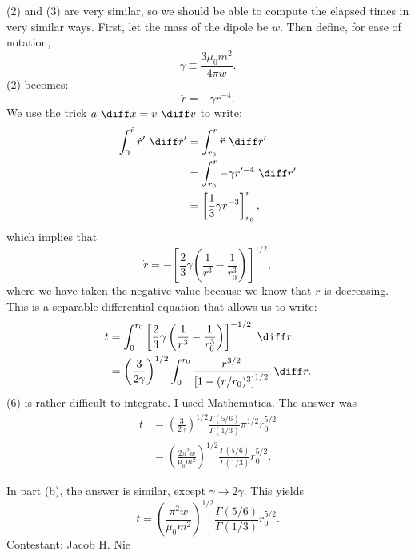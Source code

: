 \documentclass[12pt]{article}
\begin{document}
(2) and (3) are very similar, so we should be able to compute the elapsed times in very similar ways.  First, let the mass of the dipole be $w.$  Then define, for ease of notation,
\[
	\gamma \equiv \frac{3 \mu_0 m^2}{4 \pi w}.
\]
(2) becomes:
\begin{equation}
	\ddot{r} = -\gamma r^{-4}.
\end{equation}
We use the trick $a\ \diff x = v \ \diff v$ to write:
\begin{align*}
	\int_{0}^{\dot{r}} \dot{r}' \ \diff \dot{r} ' &= \int _{r_0}^{r} \ddot{r} \ \diff r' \\
						      &= \int_{r_0} ^{r} - \gamma r'^{-4} \ \diff r' \\
						      &= \left[ \frac{1}{3}\gamma r^{-3} \right]_{r_0}^r,
\end{align*}
which implies that
\begin{equation}
	\dot{r} = -\left[ \frac{2}{3}\gamma\left( \frac{1}{r^3} - \frac{1}{r_0^3} \right) \right]^{1/2},
\end{equation}
where we have taken the negative value because we know that $r$ is decreasing.  This is a separable differential equation that allows us to write:
\begin{align}
	t &= \int_0^{r_0} \left[ \frac{2}{3}\gamma\left( \frac{1}{r^3} - \frac{1}{r_0^3} \right) \right]^{-1/2} \ \diff r \nonumber \\
	  &= \left( \frac{3}{2\gamma} \right)^{1/2} \int_0^{r_0} \frac{r^{3/2}}{\left[1-(r/r_0)^3\right]^{1/2}} \ \diff r.
\end{align}
(6) is rather difficult to integrate.  I used Mathematica.  The answer was
\begin{align}
	t &= \left( \frac{3}{2\gamma} \right)^{1/2} \frac{\Gamma(5/6)}{\Gamma(1/3)} \pi^{1/2} r_0^{5/2} \nonumber \\
	  &= \left( \frac{2\pi^2 w}{\mu_0 m^2} \right) ^{1/2} \frac{\Gamma(5/6)}{\Gamma(1/3)} r_0^{5/2}.
\end{align}

In part (b), the answer is similar, except $\gamma \to 2\gamma$.  This yields
\begin{equation}
	t = \left( \frac{\pi^2 w}{\mu_0 m^2} \right) ^{1/2} \frac{\Gamma(5/6)}{\Gamma(1/3)} r_0^{5/2}.
\end{equation}
\vspace{1cm}
\hfill Contestant: Jacob H. Nie
\end{document}
